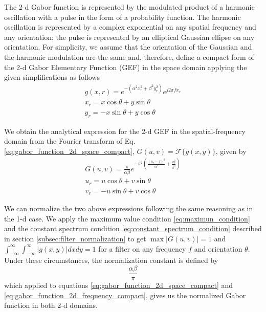 The 2-d Gabor function is represented by the modulated product of a harmonic oscillation with a pulse in the form of a probability function. The harmonic oscillation is represented by a complex exponential on any spatial frequency and any orientation; the pulse is represented by an elliptical Gaussian ellipse on any orientation. For simplicity, we assume that the orientation of the Gaussian and the harmonic modulation are the same and, therefore, define a compact form of the 2-d Gabor Elementary Function (GEF) in the space domain applying the given simplifications as follows
\begin{equation}\label{eq:gabor_function_2d_space_compact}
    \begin{gathered}
        g(x, r) =  e ^{-\left(\alpha^2 x_r^2 + \beta^2 y_r^2\right)} e ^{j 2 \pi f x_r } \\
        x_r = x \cos{\theta} + y \sin{\theta}\\
        y_r = -x \sin{\theta} + y \cos{\theta}
     \end{gathered}
\end{equation}

We obtain the analytical expression for the 2-d GEF in the spatial-frequency domain from the Fourier transform of Eq. \eqref{eq:gabor_function_2d_space_compact}, $G(u, v) = \mathcal{F}\{g(x, y)\}$, given by 
\begin{equation}\label{eq:gabor_function_2d_frequency_compact}
    \begin{gathered}
        G(u, v) =  \frac{\pi}{\alpha \beta} e ^{- \pi^2 \left(\frac{\left( u_r - f\right)^2}{\alpha^2} + \frac{v_r^2}{\beta^2}\right)} \\
        u_r = u \cos{\theta} + v \sin{\theta}\\
        v_r = -u \sin{\theta} + v \cos{\theta}
     \end{gathered}
\end{equation}

We can normalize the two above expressions following the same reasoning as in the 1-d case. We apply the maximum value condition \eqref{eq:maximun_condition} and the constant spectrum condition \eqref{eq:constant_spectrum_condition} described in section \ref{subsec:filter_normalization} to get $\max{|G(u,v)|} = 1$ and $\int_{-\infty}^{\infty} \int_{-\infty}^{\infty} |g(x,y)| dx dy = 1$ for a filter on any frequency $f$ and orientation $\theta$. 
Under these circumstances, the normalization constant is defined by
\begin{equation}\label{eq:normalization_constant_2d}
    \frac{\alpha \beta}{\pi}
\end{equation}
which applied to equations \eqref{eq:gabor_function_2d_space_compact}  and \eqref{eq:gabor_function_2d_frequency_compact}, gives us the normalized Gabor function in both 2-d domains. 

